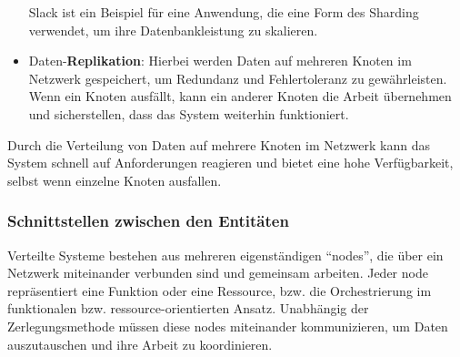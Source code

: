 \documentclass[../vs-script-first-v01.tex]{subfiles}
\begin{document}
\begin{itemize}
Slack ist ein Beispiel für eine Anwendung, die eine Form des Sharding verwendet, um ihre Datenbankleistung zu skalieren. 
\item Daten-\textbf{Replikation}: Hierbei werden Daten auf mehreren Knoten im Netzwerk gespeichert, um Redundanz und Fehlertoleranz zu gewährleisten. Wenn ein Knoten ausfällt, kann ein anderer Knoten die Arbeit übernehmen und sicherstellen, dass das System weiterhin funktioniert.
\end{itemize}
 Durch die Verteilung von Daten auf mehrere Knoten im Netzwerk kann das System schnell auf Anforderungen reagieren und bietet eine hohe Verfügbarkeit, selbst wenn einzelne Knoten ausfallen.

\subsubsection{Schnittstellen zwischen den Entitäten}

Verteilte Systeme bestehen aus mehreren eigenständigen \enquote{nodes}, die über ein Netzwerk miteinander verbunden sind und gemeinsam arbeiten. Jeder node repräsentiert eine Funktion oder eine Ressource, bzw. die Orchestrierung im funktionalen bzw. ressource-orientierten Ansatz. Unabhängig der Zerlegungsmethode müssen diese nodes miteinander kommunizieren, um Daten auszutauschen und ihre Arbeit zu koordinieren. 
\end{document}

